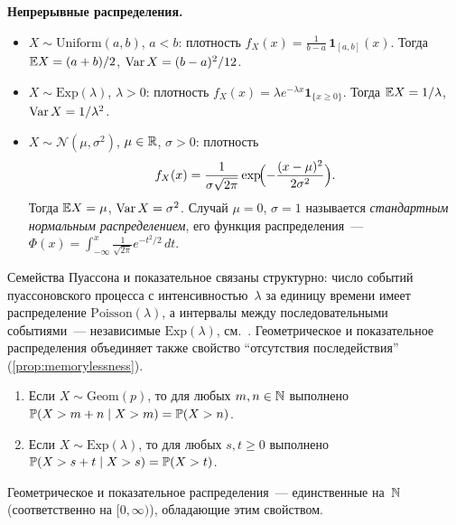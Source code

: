\medskip
\noindent\textbf{Непрерывные распределения.}

\begin{definition}
\label{def:continuous-distributions}
\hphantom{x}
\begin{itemize}
  \item $X \sim \mathrm{Uniform}(a, b)$, $a < b$: плотность $f_X(x) = \frac{1}{b - a}\, \mathbf{1}_{[a, b]}(x)$. Тогда $\mathbb{E} X = (a + b)/2$, $\operatorname{Var} X = (b - a)^2 / 12$.
  \item $X \sim \mathrm{Exp}(\lambda)$, $\lambda > 0$: плотность $f_X(x) = \lambda e^{-\lambda x} \mathbf{1}_{\{x \geq 0\}}$. Тогда $\mathbb{E} X = 1/\lambda$, $\operatorname{Var} X = 1/\lambda^2$.
  \item $X \sim \mathcal{N}(\mu, \sigma^2)$, $\mu \in \mathbb{R}$, $\sigma > 0$: плотность
        \[
          f_X(x) = \frac{1}{\sigma \sqrt{2\pi}} \exp\!\Bigl(-\frac{(x - \mu)^2}{2\sigma^2}\Bigr).
        \]
        Тогда $\mathbb{E} X = \mu$, $\operatorname{Var} X = \sigma^2$. Случай $\mu = 0$, $\sigma = 1$ называется \emph{стандартным нормальным распределением}, его функция распределения~--- $\Phi(x) = \int_{-\infty}^{x} \tfrac{1}{\sqrt{2\pi}} e^{-t^2/2}\, dt$.
\end{itemize}
\end{definition}

Семейства Пуассона и показательное связаны структурно: число событий пуассоновского процесса с интенсивностью~$\lambda$ за единицу времени имеет распределение $\mathrm{Poisson}(\lambda)$, а интервалы между последовательными событиями~--- независимые $\mathrm{Exp}(\lambda)$, см.~\cite[гл.~II, \S~3]{Sevastyanov1982}. Геометрическое и показательное распределения объединяет также свойство ``отсутствия последействия'' (\cref{prop:memorylessness}).

\begin{proposition}
\label{prop:memorylessness}
\hphantom{x}
\begin{enumerate}[label=(\alph*)]
  \item Если $X \sim \mathrm{Geom}(p)$, то для любых $m, n \in \mathbb{N}$ выполнено $\mathbb{P}(X > m + n \mid X > m) = \mathbb{P}(X > n)$.
  \item Если $X \sim \mathrm{Exp}(\lambda)$, то для любых $s, t \geq 0$ выполнено $\mathbb{P}(X > s + t \mid X > s) = \mathbb{P}(X > t)$.
\end{enumerate}
Геометрическое и показательное распределения~--- единственные на~$\mathbb{N}$ (соответственно на $[0, \infty)$), обладающие этим свойством.
\end{proposition}

